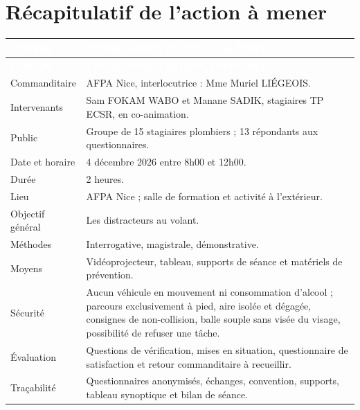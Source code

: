\section{Récapitulatif de l'action à mener}
\begin{longtable}{@{}p{}p{}@{}}

\toprule
\rowcolor{bleuECSR}
\textcolor{white}{\textbf{Élément}} &
\textcolor{white}{\textbf{Cadrage retenu ou point à confirmer}} \\
\midrule
\endfirsthead

\toprule
\rowcolor{bleuECSR}
\textcolor{white}{\textbf{Élément}} &
\textcolor{white}{\textbf{Cadrage retenu ou point à confirmer}} \\
\midrule
\endhead

Commanditaire &
AFPA Nice, interlocutrice : Mme Muriel LIÉGEOIS. \\
\midrule

Intervenants &
Sam FOKAM WABO et Manane SADIK, stagiaires TP ECSR, en co-animation. \\
\midrule

Public &
Groupe de 15 stagiaires plombiers ; 13 répondants aux questionnaires. \\
\midrule

Date et horaire &
4 décembre 2026 entre 8h00 et 12h00. \\
\midrule

Durée &
2 heures. \\
\midrule

Lieu &
AFPA Nice ; salle de formation et activité à l'extérieur. \\
\midrule

Objectif général &
Les distracteurs au volant. \\
\midrule

Méthodes &
Interrogative, magistrale, démonstrative. \\
\midrule

Moyens &
Vidéoprojecteur, tableau, supports de séance et matériels de prévention. \\
\midrule

Sécurité &
Aucun véhicule en mouvement ni consommation d’alcool ; parcours exclusivement à pied,
aire isolée et dégagée, consignes de non-collision, balle souple sans visée du visage,
possibilité de refuser une tâche. \\
\midrule

Évaluation &
Questions de vérification, mises en situation, questionnaire de satisfaction
et retour commanditaire à recueillir. \\
\midrule

Traçabilité &
Questionnaires anonymisés, échanges, convention, supports,
tableau synoptique et bilan de séance. \\

\bottomrule
\end{longtable}


